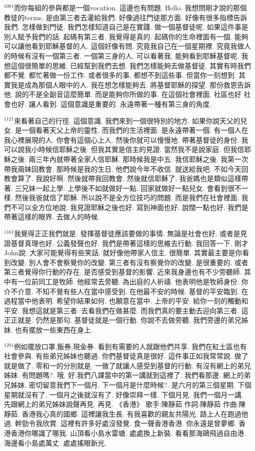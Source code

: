 \documentclass{book}
\begin{document}
$^{1081}$而你每組的參與都是一個vocation.
這邊也有問題.
Hello.
我想問剛才說的那個教徒的terms.
是由第三者去灌給我們.
好像過往門徒那方面.
好像有很多指標告訴我們.
怎樣做到門徒.
我們怎樣知道自己是在實踐.
做一個基督徒呢.
如果這件事是別人賦予我們的話.
起碼有第三者.
我覺得是真的.
起碼你的生命裡面有一個.
能夠可以讓他看到耶穌基督的人.
這個好像有問.
究竟我自己在一個星期裡.
究竟我做人的時候有沒有一個第三者.
一個第三身的人.
可以看著我.
能夠看到耶穌基督呢.
我想這個很簡單的思維.
已經幫到我們去想.
我們怎樣能夠去做基督徒.
其實有時我們都不覺.
都忙著做一份工作.
或者很多的事.
都想不到這些事.
但當你一刻想到.
其實我是成為那個人眼中的人.
我在想怎樣能夠去.
將基督耶穌的探望.
那份救恩告訴他.
說的不是全副音這麼簡單.
而是能夠你所做的事.
在這個社會裡面.
社區也好 社會也好.
讓人看到.
這個意識是重要的.
永遠帶著一種有第三身的角度.

$^{1121}$來看著自己的行徑.
這個意識.
我們來到一個很特別的地方.
如果你說天父的兒女.
是一個看著天父上帝的靈性.
而我們的生活裡面.
是永遠帶著一個.
有一個人在我心裡展現的人.
你會有這個心上人.
然後你就可以慢慢地.
帶著基督徒的身份.
我可以說我小時候信耶穌之後.
但我其實是信主的見證.
當然我不是說家庭.
但我信耶穌之後.
兩三年內就帶著全家人信耶穌.
那時候我是中五.
我信耶穌之後.
我第一次帶我兩妹回教會.
那時候是我的生日.
他們說今年不收信.
就送給我吧.
不如今天回教會算了.
我說好啊.
然後就帶我回教會.
然後就信耶穌了.
我爸媽也是類似這樣帶著.
三兄妹一起上學.
上學後不如就做好一點.
回家就做好一點兒女.
會看到很不一樣.
然後我爸就信了耶穌.
所以說不是全方位技巧的問題.
而是我們在社會裡面.
我們不可以全方位地說.
我見證耶穌之後也好.
寫到神面也好.
說闊一點也好.
我們是帶著這樣的眼界.
去做人的時候.

$^{1161}$我覺得正正我們就是.
發揮基督徒應該要做的事情.
無論是社會也好.
或者是見證基督真理也好.
公義發聲也好.
我們是帶著這樣的思維去行動.
我回答一下.
剛才John說.
大家可能覺得有些笑話.
就好像他帶家人信主.
很簡單.
其實最主要是你看到改變.
別人會不會察覺你的改變.
第三者有沒有察覺你的改變.
是很重要的.
或者第三者覺得你行動的存在.
是否感受到基督的影響.
近來我身邊也有不少旁聽師.
其中有一位前同工是牧師.
他經常去旁聽.
為出庭的人祈禱.
他表明他是牧師身份.
你介不介意.
不知不覺有些人在當中感受到.
在他最不安的時候.
基督的平安臨到.
在過程當中他表明.
希望你結果如何.
也願意在當中.
上帝的平安.
給你一刻的觸動和平安.
我想這就是第三者.
去看我們在做甚麼.
而我們真的要主動去迎向第三者.
這正正就是.
仍然是那句.
基督徒就是一個行動.
你說不去做旁聽.
我們旁邊的弟兄姊妹.
也有擺放一些東西在身上.

$^{1201}$例如擺放口罩,飯券,現金券.
看到有需要的人就跟他們共享.
我們在紅土區也有社會參與.
有些弟兄姊妹也聽過.
你們基督徒真是很好.
這件事正如我常常說.
做了就是做了.
零和一的分別就是.
一做了就讓人感受到基督的行動.
有沒有網上的弟兄姊妹.
有問題嗎?.
哦.
好,我們八課當中的第一講就到這裡了.
我們看那邊.
網上的弟兄姊妹.
密切留意我們下一個月.
下一個月是什麼時候?.
是六月的第三個星期.
下個星期就沒有了.
一個月之後就沒有了.
好像崇拜一樣.
下個月見.
我們一個月一講.
先跟網上的弟兄姊妹說聲再見.
再見.
《香港》 歌手:陳靜茹 作詞:陳靜茹 作曲:陳靜茹.
香港我心真的國鄉.
這裡讓我生長.
有我喜歡的親友共陽光.
路上人在跑過他過.
幹勁令我欣賞.
這裡有許多好處沒發覺.
食一聲香港香港.
你永遠是曾夢鄉.
香港香港你哪識了哪我.
山頂看小島水雷塘.
處處換上新裝.
看看那海鷗飛過自由港.
海邊看小島處萬丈.
處處搖眼新光.
\end{document}
